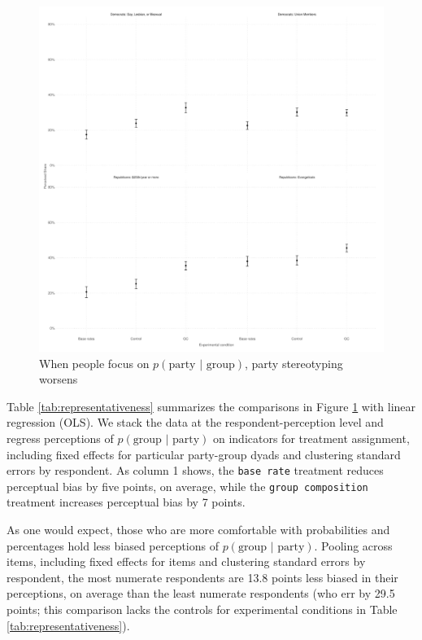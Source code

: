 \documentclass[12pt, letterpaper]{article}
\begin{document}
\begin{figure}
\caption{When people focus on $p(\text{party | group})$, party stereotyping worsens}
\label{fig:rep_ciplots}
\begin{center}
\includegraphics[width=1\textwidth]{../figs/misinfo_bayes_fig.pdf}
\end{center}
\end{figure}

Table \ref{tab:representativeness} summarizes the comparisons in Figure \ref{fig:rep_ciplots} with linear regression (OLS). We stack the data at the respondent-perception level and regress perceptions of $p(\text{group | party})$ on indicators for treatment assignment, including fixed effects for particular party-group dyads and clustering standard errors by respondent. As column 1 shows, the {\tt base rate} treatment reduces perceptual bias by five points, on average, while the {\tt group composition} treatment increases perceptual bias by 7 points. 

As one would expect, those who are more comfortable with probabilities and percentages hold less biased perceptions of $p(\text{group | party})$. Pooling across items, including fixed effects for items and clustering standard errors by respondent, the most numerate respondents are 13.8 points less biased in their perceptions, on average than the least numerate respondents (who err by 29.5 points; this comparison lacks the controls for experimental conditions in Table \ref{tab:representativeness}).
\end{document}
